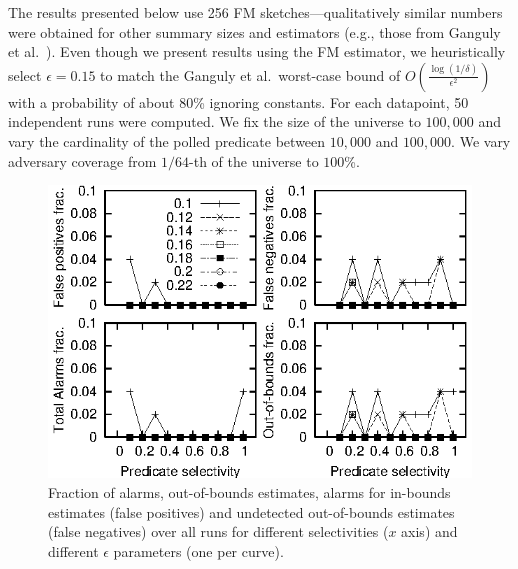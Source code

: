 \documentclass[10pt,twocolumn]{article}
\begin{document}
\vspace{-1em}
The results presented below use 256 FM sketches---qualitatively similar numbers were
obtained for other summary sizes and estimators (e.g., those from
Ganguly et al.~\cite{Ganguly2003}). Even though we present results using the FM estimator,
we heuristically select $\epsilon=0.15$ to match the Ganguly et al.\ worst-case bound
of $O(\frac{\log(1/\delta)}{\epsilon^2})$ with a probability of about
$80$\% ignoring constants.
For each datapoint, 50
independent runs were computed.  We fix the size of the universe to
$100,000$ and vary the cardinality of the polled predicate between
$10,000$ and $100,000$.  We vary adversary
coverage from $1/64$-th of the universe to $100$\%.

\begin{figure}
\centerline{\includegraphics{results/benign}}
\caption{Fraction of alarms, out-of-bounds estimates, alarms for
  in-bounds estimates (false positives) and undetected out-of-bounds
  estimates (false negatives) over all runs for different selectivities ($x$ axis) and
  different $\epsilon$ parameters (one per curve).}
\label{fig:benign}
\vspace*{-2em}
\end{figure}
\end{document}
